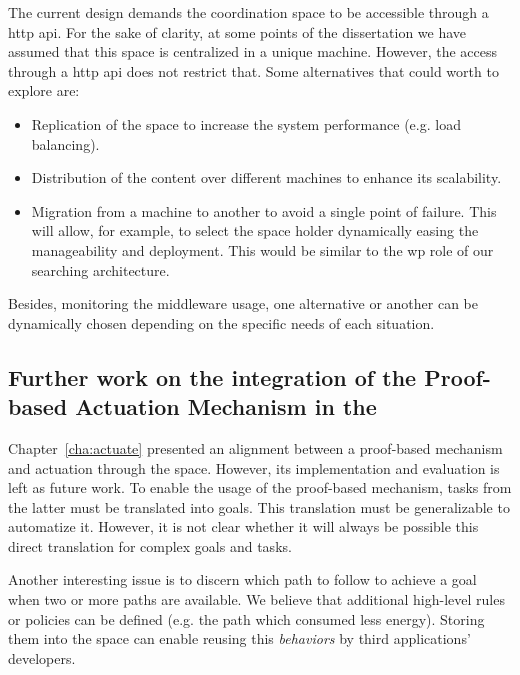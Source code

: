 The current design demands the coordination space to be accessible through a \ac{http} \ac{api}.
For the sake of clarity, at some points of the dissertation we have assumed that this space is centralized in a unique machine.
However, the access through a \ac{http} \ac{api} does not restrict that.
Some alternatives that could worth to explore are: %
\begin{itemize}
  \item Replication of the space to increase the system performance (e.g. load balancing).
  \item Distribution of the content over different machines to enhance its scalability. %
  \item Migration from a machine to another to avoid a single point of failure.
        This will allow, for example, to select the space holder dynamically easing the manageability and deployment.
        This would be similar to the \ac{wp} role of our searching architecture. %
\end{itemize}

Besides, monitoring the middleware usage, one alternative or another can be dynamically chosen depending on the specific needs of each situation.


\subsection{Further work on the integration of the Proof-based Actuation Mechanism in the \Space{}}

Chapter~\ref{cha:actuate} presented an alignment between a proof-based mechanism and actuation through the space.
However, its implementation and evaluation is left as future work.
To enable the usage of the proof-based mechanism, tasks from the latter must be translated into goals.
This translation must be generalizable to automatize it.
However, it is not clear whether it will always be possible this direct translation for complex goals and tasks.


Another interesting issue is to discern which path to follow to achieve a goal when two or more paths are available.
We believe that additional high-level rules or policies can be defined (e.g. the path which consumed less energy).
Storing them into the space can enable reusing this \emph{behaviors} by third applications' developers.


